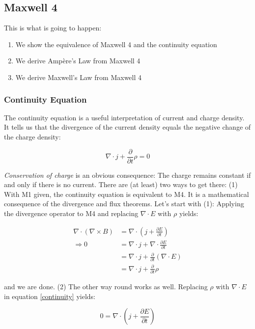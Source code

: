 \documentclass{article}
\begin{document}
\subsection{Maxwell 4}

This is what is going to happen:

\begin{enumerate}
    \item We show the equivalence of Maxwell 4 and the continuity equation
    \item We derive Ampère's Law from Maxwell 4
    \item We derive Maxwell's Law from Maxwell 4
\end{enumerate}

\subsubsection{Continuity Equation}
The continuity equation is a useful interpretation of current and charge density. It tells us that the divergence of the current density equals the negative change of the charge density: 

\begin{equation} \label{continuity}
\nabla \cdot j + \frac{\partial}{\partial t} \rho = 0
\end{equation}

\emph{Conservation of charge} is an obvious consequence: The charge remains constant if and only if there is no current. There are (at least) two ways to get there: (1) With M1 given, the continuity equation is equivalent to M4. It is a mathematical consequence of the divergence and flux theorems. Let's start with (1): Applying the divergence operator to M4 and replacing $\nabla \cdot E$ with $\rho$ yields:

\begin{align*}
\nabla \cdot (\nabla \times B) &= \nabla \cdot (j + \frac{\partial E}{\partial t}) \\
\Rightarrow 0 &= \nabla \cdot j + \nabla \cdot \frac{\partial E}{\partial t} \\
&=  \nabla \cdot j + \frac{\partial}{\partial t} (\nabla \cdot E) \\
&=  \nabla \cdot j + \frac{\partial}{\partial t} \rho          
\end{align*}

and we are done. (2) The other way round works as well. Replacing $\rho$ with $\nabla \cdot E$ in equation \ref{continuity} yields:

\begin{equation*}
0 = \nabla \cdot (j + \frac{\partial E}{\partial t})
\end{equation*}
\end{document}
